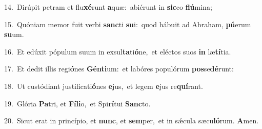 {\numbfont\textcolor{\numbcolor}{14.}}~Dirúpit petram et flu\-\textbf{xé}\-runt \textbf{a}\-quæ:~\star abiérunt in \textbf{sic}\-co \textbf{flú}\-mina;\par
{\numbfont\textcolor{\numbcolor}{15.}}~Quóniam memor fuit verbi \textbf{sanc}\-ti \textbf{su}\-i:~\star quod hábuit ad Abraham, \textbf{pú}\-erum \textbf{su}\-um.\par
{\numbfont\textcolor{\numbcolor}{16.}}~Et edúxit pópulum suum in exsul\-\textbf{ta}\-ti\-\textbf{ó}\-ne,~\star et eléctos suos \textbf{in} læ\-\textbf{tí}\-tia.\par
{\numbfont\textcolor{\numbcolor}{17.}}~Et dedit illis regi\-\textbf{ó}\-nes \textbf{Gén}\-\textbf{ti}um:~\star et labóres populórum \textbf{pos}\-se\-\textbf{dé}\-runt:\par
{\numbfont\textcolor{\numbcolor}{18.}}~Ut custódiant justificati\-\textbf{ó}\-nes \textbf{e}\-jus,~\star et legem \textbf{e}\-jus re\-\textbf{quí}\-rant.\par
{\numbfont\textcolor{\numbcolor}{19.}}~Glória \textbf{Pa}\-tri, et \textbf{Fí}\-\textbf{li}o,~\star et Spi\-\textbf{rí}\-tui \textbf{Sanc}\-to.\par
{\numbfont\textcolor{\numbcolor}{20.}}~Sicut erat in princípio, et \textbf{nunc}\-, et \textbf{sem}\-per,~\star et in sǽcula sæcu\-\textbf{ló}\-rum. \textbf{A}\-men.\par

